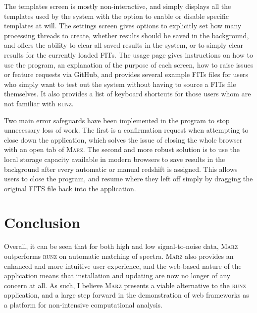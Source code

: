 \documentclass[iop]{emulateapj}
\newcommand{\runz}{\textsc{runz}}
\newcommand{\marz}{\textsc{Marz}}
\begin{document}
The templates screen is mostly non-interactive, and simply displays all the templates used by the system with the option to enable or disable specific templates at will. The settings screen gives options to explicitly set how many processing threads to create, whether results should be saved in the background, and offers the ability to clear all saved results in the system, or to simply clear results for the currently loaded FITs. The usage page gives instructions on how to use the program, an explanation of the purpose of each screen, how to raise issues or feature requests via GitHub, and provides several example FITs files for users who simply want to test out the system without having to source a FITs file themselves. It also provides a list of keyboard shortcuts for those users whom are not familiar with \runz{}.

Two main error safeguards have been implemented in the program to stop unnecessary loss of work. The first is a confirmation request when attempting to close down the application, which solves the issue of closing the whole browser with an open tab of \marz{}. The second and more robust solution is to use the local storage capacity available in modern browsers to save results in the background after every automatic or manual redshift is assigned. This allows users to close the program, and resume where they left off simply by dragging the original FITS file back into the application.













\section{Conclusion}

Overall, it can be seen that for both high and low signal-to-noise data, \marz{} outperforms \runz{} on automatic matching of spectra. \marz{} also provides an enhanced and more intuitive user experience, and the web-based nature of the application means that installation and updating are now no longer of any concern at all. As such, I believe \marz{} presents a viable alternative to the \runz{} application, and a large step forward in the demonstration of web frameworks as a platform for non-intensive computational analysis.
\end{document}
